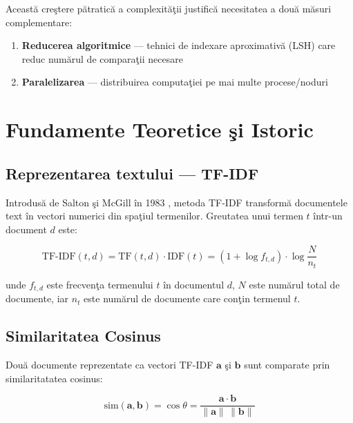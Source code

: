 \documentclass[a4paper,12pt]{report}
\begin{document}
Aceast\u{a} cre\c{s}tere p\u{a}tratic\u{a} a complexit\u{a}\c{t}ii justific\u{a} necesitatea a dou\u{a} m\u{a}suri complementare:
\begin{enumerate}
  \item \textbf{Reducerea algoritmice} — tehnici de indexare aproximativ\u{a} (LSH) care reduc num\u{a}rul de compara\c{t}ii necesare
  \item \textbf{Paralelizarea} — distribuirea computa\c{t}iei pe mai multe procese/noduri
\end{enumerate}

\chapter{Fundamente Teoretice \c{s}i Istoric}

\section{Reprezentarea textului — \ac{TF-IDF}}

Introdus\u{a} de Salton \c{s}i McGill \^{i}n 1983 \cite{salton1983}, metoda \ac{TF-IDF} transform\u{a} documentele text \^{i}n vectori numerici din spa\c{t}iul termenilor. Greutatea unui termen $t$ \^{i}ntr-un document $d$ este:

\begin{equation}
  \text{TF-IDF}(t,d) = \text{TF}(t,d) \cdot \text{IDF}(t)
  = \left(1 + \log f_{t,d}\right) \cdot \log\!\frac{N}{n_t}
\label{eq:tfidf}
\end{equation}

unde $f_{t,d}$ este frecven\c{t}a termenului $t$ \^{i}n documentul $d$, $N$ este num\u{a}rul total de documente, iar $n_t$ este num\u{a}rul de documente care con\c{t}in termenul $t$.

\section{Similaritatea Cosinus}

Dou\u{a} documente reprezentate ca vectori TF-IDF $\mathbf{a}$ \c{s}i $\mathbf{b}$ sunt comparate prin similaritatatea cosinus:

\begin{equation}
  \text{sim}(\mathbf{a}, \mathbf{b}) = \cos\theta = \frac{\mathbf{a} \cdot \mathbf{b}}{\|\mathbf{a}\|\,\|\mathbf{b}\|}
\label{eq:cosine}
\end{equation}
\end{document}
